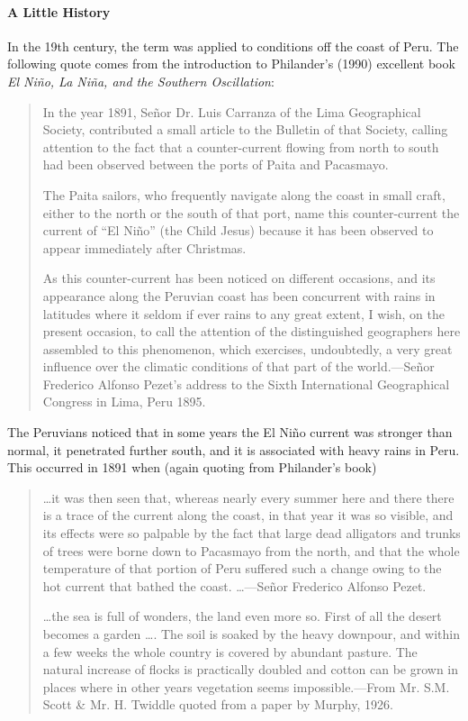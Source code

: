 \paragraph{A Little History}
In the 19th century, the term was applied to conditions off the coast of Peru. The following quote comes from the introduction to Philander's (1990) excellent book \textit{El Ni\~{n}o, La Ni\~{n}a, and the Southern Oscillation}: 
\begin{quotation} \small
In the year 1891, Se\~{n}or Dr. Luis Carranza of the Lima Geographical Society, contributed a small article to the Bulletin of that Society, calling attention to the fact that a counter-current flowing from north to south had been observed between the ports of Paita and Pacasmayo.

The Paita sailors, who frequently navigate along the coast in small craft, either to the north or the south of that port, name this counter-current the current of ``El Ni\~{n}o'' (the Child Jesus) because it has been observed to appear immediately after Christmas.

As this counter-current has been noticed on different occasions, and its appearance along the Peruvian coast has been concurrent with rains in latitudes where it seldom if ever rains to any great extent, I wish, on the present occasion, to call the attention of the distinguished geographers here assembled to this phenomenon, which exercises, undoubtedly, a very great influence over the climatic conditions of that part of the world.---Se\~{n}or Frederico Alfonso Pezet's address to the Sixth International Geographical Congress in Lima, Peru 1895.
\end{quotation}

The Peruvians noticed that in some years the El Ni\~{n}o current was stronger
than normal, it penetrated further south, and it is associated with heavy rains
in Peru. This occurred in 1891 when (again quoting from Philander's book)
\begin{quotation} \small
\ldots it was then seen that, whereas nearly every summer here and there there is
a trace of the current along the coast, in that year it was so visible, and its
effects were so palpable by the fact that large dead alligators and trunks of
trees were borne down to Pacasmayo from the north, and that the whole
temperature of that portion of Peru suffered such a change owing to the hot
current that bathed the coast. \ldots ---Se\~{n}or Frederico
Alfonso Pezet.

\ldots the sea is full of wonders, the land even more so. First of all the
desert becomes a garden \ldots . The soil is soaked by the heavy downpour, and
within a few weeks the whole country is covered by abundant pasture. The natural
increase of flocks is practically doubled and cotton can be grown in places
where in other years vegetation seems impossible.---From Mr. S.M. Scott
\& Mr. H. Twiddle quoted from a paper by Murphy, 1926.
\end{quotation}

